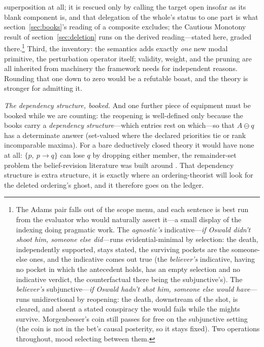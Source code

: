\documentclass[11pt]{article}
\theoremstyle{definition}
\begin{document}
superposition at all; it is rescued only by calling the target open insofar as its blank component is, and that delegation of the whole's status to one part is what section~\ref{sec:books}'s reading of a composite excludes; the Cautious Monotony result of section~\ref{sec:deletion} runs on the derived reading---stated here, graded there.\footnote{The Adams pair falls out of the scope menu, and each sentence is best run from the evaluator who would naturally assert it---a small display of the indexing doing pragmatic work. The \emph{agnostic's} indicative---\emph{if Oswald didn't shoot him, someone else did}---runs evidential-minimal by selection: the death, independently supported, stays stated, the surviving pockets are the someone-else ones, and the indicative comes out true (the \emph{believer's} indicative, having no pocket in which the antecedent holds, has an empty selection and no indicative verdict, the counterfactual there being the subjunctive's). The \emph{believer's} subjunctive---\emph{if Oswald hadn't shot him, someone else would have}---runs unidirectional by reopening: the death, downstream of the shot, is cleared, and absent a stated conspiracy the would fails while the mights survive. Morgenbesser's coin still passes for free on the subjunctive setting (the coin is not in the bet's causal posterity, so it stays fixed). Two operations throughout, mood selecting between them.} Third, the inventory: the semantics adds exactly \emph{one} new modal primitive, the perturbation operator itself; validity, weight, and the pruning are all inherited from machinery the framework needs for independent reasons. Rounding that one down to zero would be a refutable boast, and the theory is stronger for admitting it.

\textit{The dependency structure, booked.} And one further piece of equipment must be booked while we are counting: the reopening is well-defined only because the books carry a \emph{dependency structure}---which entries rest on which---so that $A \ominus q$ has a determinate answer (set-valued where the declared priorities tie or rank incomparable maxima). For a bare deductively closed theory it would have none at all: $\{p,\ p \to q\}$ can lose $q$ by dropping either member, the remainder-set problem the belief-revision literature was built around \cite{alchourron1985logic}. That dependency structure is extra structure, it is exactly where an ordering-theorist will look for the deleted ordering's ghost, and it therefore goes on the ledger.
\end{document}
